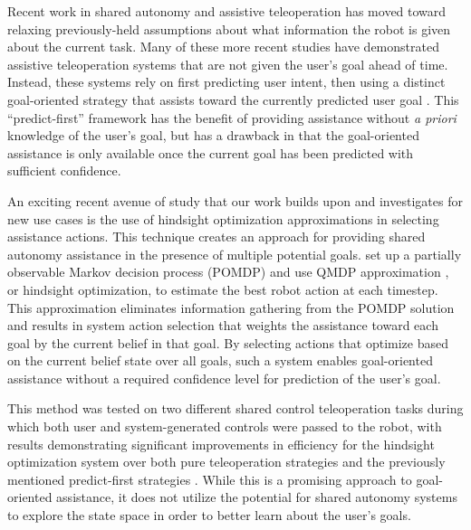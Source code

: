 \documentclass[conference]{IEEEtran}
\begin{document}
Recent work in shared autonomy and assistive teleoperation has moved toward relaxing previously-held assumptions about what information the robot is given about the current task. Many of these more recent studies have demonstrated assistive teleoperation systems that are not given the user's goal ahead of time. Instead, these systems rely on first predicting user intent, then using a distinct goal-oriented strategy that assists toward the currently predicted user goal \cite{dragan2012formalizing, fagg2004extracting, kragic2005human, schultz2017goal, yu2005telemanipulation}. This ``predict-first'' framework has the benefit of providing assistance without \textit{a priori} knowledge of the user's goal, but has a drawback in that the goal-oriented assistance is only available once the current goal has been predicted with sufficient confidence.

An exciting recent avenue of study that our work builds upon and investigates for new use cases is the use of hindsight optimization approximations in selecting assistance actions. This technique creates an approach for providing shared autonomy assistance in the presence of multiple potential goals. \citet{javdani2015shared} set up a partially observable Markov decision process (POMDP) and use QMDP approximation \cite{littman1995learning}, or hindsight optimization, to estimate the best robot action at each timestep. This approximation eliminates information gathering from the POMDP solution and results in system action selection that weights the assistance toward each goal by the current belief in that goal. By selecting actions that optimize based on the current belief state over all goals, such a system enables goal-oriented assistance without a required confidence level for prediction of the user's goal. 

This method was tested on two different shared control teleoperation tasks during which both user and system-generated controls were passed to the robot, with results demonstrating significant improvements in efficiency for the hindsight optimization system over both pure teleoperation strategies and the previously mentioned predict-first strategies \cite{javdani2018shared}. While this is a promising approach to goal-oriented assistance, it does not utilize the potential for shared autonomy systems to explore the state space in order to better learn about the user's goals.
\end{document}
